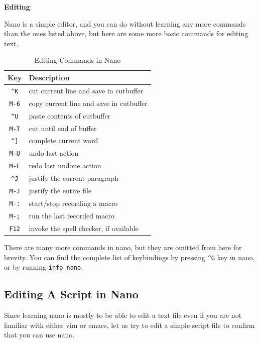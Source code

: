 \textbf{Editing}

Nano is a simple editor, and you can do without learning
any more commands than the ones listed above, but here
are some more basic commands for editing text.

\begin{table}[h!]
  \caption{Editing Commands in Nano}
  \begin{tabular}{c l}
    \toprule
    Key & Description \\
    \midrule
    \texttt{\textasciicircum K} & cut current line and save in cutbuffer \\
    \texttt{M-6} & copy current line and save in cutbuffer \\
    \texttt{\textasciicircum U} & paste contents of cutbuffer \\
    \texttt{M-T} & cut until end of buffer \\
    \texttt{\textasciicircum ]} & complete current word \\
    \texttt{M-U} & undo last action \\
    \texttt{M-E} & redo last undone action \\
    \texttt{\textasciicircum J} & justify the current paragraph \\
    \texttt{M-J} & justify the entire file \\
    \texttt{M-:} & start/stop recording a macro \\
    \texttt{M-;} & run the last recorded macro \\
    \texttt{F12} & invoke the spell checker, if available \\
    \bottomrule
  \end{tabular}
\end{table}

There are many more commands in nano, but they are
omitted from here for brevity. You can find the
complete list of keybindings by pressing \texttt{\textasciicircum G}
key in nano, or by running \lstinline[language=bash]{info nano}.

\subsection{Editing A Script in Nano}

Since learning nano is mostly to be able to edit
a text file even if you are not familiar with
either vim or emacs, let us try to edit a simple
script file to confirm that you can use nano.

